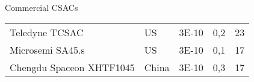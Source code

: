 \begin{frame}{Commercial CSACs}
\begin{table}
{\begin{tabular}{l|llll}
                Teledyne TCSAC              & US               & 3E-10         & 0,2            & 23                      \\
                Microsemi SA45.s            & US               & 3E-10         & 0,1            & 17                      \\
                Chengdu Spaceon XHTF1045    & China            & 3E-10         & 0,3            & 17                      \\
                \hline
            \end{tabular}
        }
    \end{table}


\end{frame}



